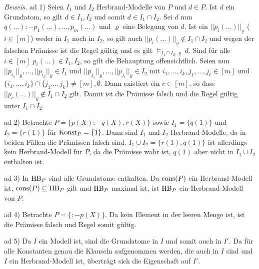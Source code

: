 \documentclass[12pt,a4paper]{amsart}
\begin{document}
{\em Beweis.}
ad 1) Seien $I_1$ und $I_2$ Herbrand-Modelle von $P$ und $d\in P$. Ist $d$ ein Grundatom, so gilt $d\in I_1,I_2$ und somit $d\in I_1\cap I_2$. Sei $d$ nun $q(\dots):-
p_1(\dots),\dots,p_m(\dots)$ und $\varrho$ eine Belegung von $d$. Ist ein $||p_i(\dots)||_{\varrho}$ ($i\in[m]$) weder in $I_1$ noch in $I_2$, so gilt auch 
$||p_i(\dots)||_{\varrho}\not\in I_1\cap I_2$ und wegen der falschen Prämisse ist die Regel gültig und es gilt $\models_{I_1\cap I_2,\varrho}d$. Sind für alle $i\in[m]$ $p_i(\dots)\in I_1,I_2$, so gilt die Behauptung offensichtlich. Seien nun $||p_{i_1}||_{\varrho},\dots,||p_{i_k}||_{\varrho}\in I_1$ und $||p_{j_1}||_{\varrho},\dots,||p_{j_{\ell}}||_{\varrho}\in I_2$ mit $i_1,\dots,i_k,j_1,\dots,j_{\ell}\in[m]$ und $\{i_1,\dots,i_k\}\cap\{j_1\dots,j_k\}\neq[m],\emptyset$. Dann existiert ein $c\in[m]$,
so dass $||p_c(\dots)||_{\varrho}\not\in I_1\cap I_2$ gilt. Damit ist die Prämisse falsch und die Regel gültig unter $I_1\cap I_2$.

\medskip

ad 2) Betrachte $P=\{p(X):-q(X),r(X)\}$ sowie $I_1=\{q(1)\}$ und $I_2=\{r(1)\}$ für $\operatorname{Konst}_P=\{1\}$. Dann sind $I_1$ und $I_2$ Herbrand-Modelle, da in beiden Fällen
die Prämissen falsch sind. $I_1\cup I_2=\{r(1),q(1)\}$ ist allerdings kein Herbrand-Modell für $P$, da die Prämisse wahr ist, $q(1)$ aber nicht in $I_1\cup I_2$ enthalten ist.

\medskip

ad 3) In $\operatorname{HB}_P$ sind alle Grundatome enthalten. Da $\operatorname{cons}(P)$ ein Herbrand-Modell ist, $\operatorname{cons}(P)\subseteq\operatorname{HB}_P$ gilt und $\operatorname{HB}_P$ maximal ist, ist $\operatorname{HB}_P$ ein Herbrand-Modell von $P$.

\medskip

ad 4) Betrachte $P=\{:-p(X)\}$. Da kein Element in der leeren Menge ist, ist die Prämisse falsch und Regel somit gültig.

\medskip

ad 5) Da $I$ ein Modell ist, sind die Grundatome in $I$ und somit auch in $I'$. Da für alle Konstanten genau die Klauseln aufgenommen werden, die auch in $I$ sind und
$I$ ein Herbrand-Modell ist, überträgt sich die Eigenschaft auf $I'$.
\end{document}
